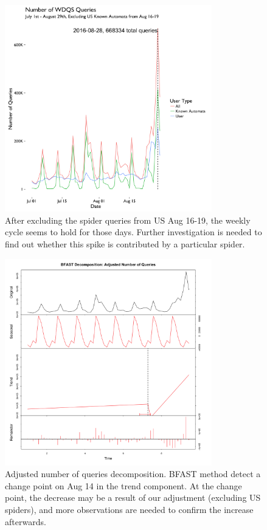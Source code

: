 \documentclass[12pt,]{article}
\begin{document}
\begin{figure}[H]
\centering
\includegraphics[width=9cm,height=9cm,keepaspectratio]{figures/all_query_ecl_us_spider0816_ts.png}
\caption{After excluding the spider queries from US Aug 16-19, the
weekly cycle seems to hold for those days. Further investigation is
needed to find out whether this spike is contributed by a particular
spider.\label{eclus}}
\end{figure}

\begin{figure}[H]
\centering
\includegraphics[width=9cm,height=9cm,keepaspectratio]{figures/adjust_query_decompose.png}
\caption{Adjusted number of queries decomposition. BFAST method detect a
change point on Aug 14 in the trend component. At the change point, the
decrease may be a result of our adjustment (excluding US spiders), and
more observations are needed to confirm the increase afterwards.}
\end{figure}
\end{document}
